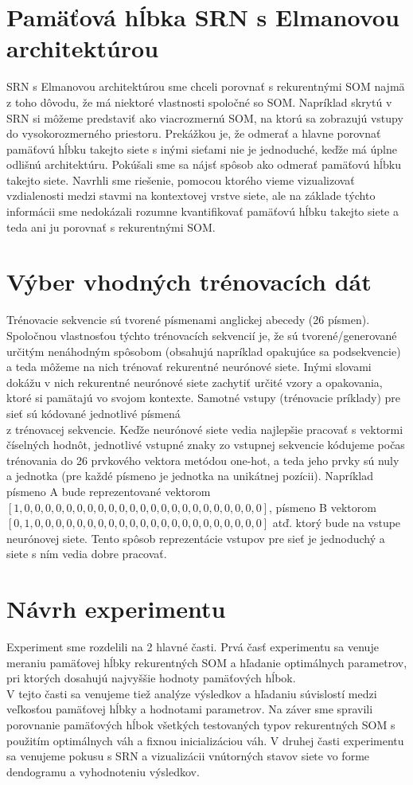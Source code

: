 \section{Pamäťová hĺbka SRN s Elmanovou architektúrou}
SRN s Elmanovou architektúrou sme chceli porovnať s rekurentnými SOM najmä z toho dôvodu, že má niektoré vlastnosti spoločné 
so SOM. Napríklad skrytú v SRN si môžeme predstaviť ako viacrozmernú SOM, na ktorú sa zobrazujú vstupy do vysokorozmerného priestoru.
Prekážkou je, že odmerať a hlavne porovnať pamäťovú hĺbku takejto siete s inými sieťami nie je jednoduché, keďže má úplne odlišnú architektúru.
Pokúšali sme sa nájsť spôsob ako odmerať pamäťovú hĺbku takejto siete.
Navrhli sme riešenie, pomocou ktorého vieme vizualizovať vzdialenosti medzi stavmi na kontextovej vrstve siete, ale
na základe týchto informácii sme nedokázali rozumne kvantifikovať pamäťovú hĺbku takejto siete a teda 
ani ju porovnať s rekurentnými SOM.


\section{Výber vhodných trénovacích dát}
Trénovacie sekvencie sú tvorené písmenami anglickej abecedy (26 písmen).
Spoločnou vlastnosťou týchto trénovacích sekvencií je, že sú tvorené/generované určitým nenáhodným spôsobom (obsahujú napríklad opakujúce sa podsekvencie)
a teda môžeme na nich trénovať rekurentné neurónové siete. 
Inými slovami dokážu v nich rekurentné neurónové siete zachytiť určité vzory a opakovania, ktoré si pamätajú vo svojom kontexte.
Samotné vstupy (trénovacie príklady) pre sieť sú kódované jednotlivé písmená \\ z trénovacej sekvencie.
Keďže neurónové siete vedia najlepšie pracovať s vektormi číselných hodnôt, jednotlivé vstupné znaky zo 
vstupnej sekvencie kódujeme počas trénovania do 26 prvkového vektora metódou one-hot, 
a teda jeho prvky sú nuly a jednotka (pre každé písmeno je jednotka na unikátnej pozícii).
Napríklad písmeno A bude reprezentované vektorom
$[1, 0, 0, 0, 0, 0, 0, 0, 0, 0, 0, 0, 0, 0, 0, 0, 0, 0, 0, 0, 0, 0, 0, 0]$,
písmeno B vektorom $[0, 1, 0, 0, 0, 0, 0, 0, 0, 0, 0, 0, 0, 0, 0, 0, 0, 0, 0, 0, 0, 0, 0, 0]$ atď. 
ktorý bude na vstupe neurónovej siete.
Tento spôsob reprezentácie vstupov pre sieť je jednoduchý a siete s ním vedia dobre pracovať.


\section {Návrh experimentu}
Experiment sme rozdelili na 2 hlavné časti. 
Prvá časť experimentu sa venuje meraniu pamäťovej hĺbky rekurentných SOM a hľadanie 
optimálnych parametrov, pri ktorých dosahujú najvyššie hodnoty pamäťových hĺbok. \\
V tejto časti sa venujeme tiež analýze výsledkov a hľadaniu súvislostí medzi veľkosťou pamäťovej hĺbky 
a hodnotami parametrov. 
Na záver sme spravili porovnanie pamäťových hĺbok všetkých testovaných typov rekurentných SOM s 
použitím optimálnych váh a fixnou inicializáciou váh.
V druhej časti experimentu sa venujeme pokusu s SRN a vizualizácii vnútorných stavov siete vo forme 
dendogramu a vyhodnoteniu výsledkov.


